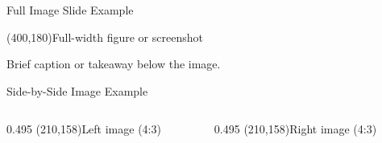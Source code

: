 \begin{frame}{Full Image Slide Example}
  \begin{center}
    {\color{slate400}\framebox(400,180){Full-width figure or screenshot}}
  \end{center}

  \vskip4pt
  Brief caption or takeaway below the image.
\end{frame}

\begin{frame}{Side-by-Side Image Example}
  \vfill
  \begin{columns}[c]
    \begin{column}{0.495\textwidth}
      {\color{slate400}\framebox(210,158){Left image (4:3)}}
    \end{column}
    \begin{column}{0.495\textwidth}
      {\color{slate400}\framebox(210,158){Right image (4:3)}}
    \end{column}
  \end{columns}
  \vfill
\end{frame}
